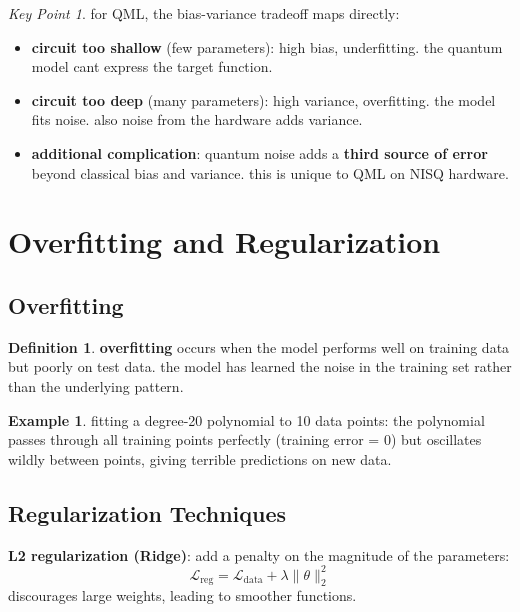 \documentclass[11pt,a4paper]{article}
\theoremstyle{definition}
\newtheorem{definition}{Definition}[section]
\newtheorem{example}{Example}[section]
\theoremstyle{remark}
\newtheorem*{keypoint}{Key Point}
\begin{document}
\begin{keypoint}
for QML, the bias-variance tradeoff maps directly:
\begin{itemize}
    \item \textbf{circuit too shallow} (few parameters): high bias, underfitting. the quantum model cant express the target function.
    \item \textbf{circuit too deep} (many parameters): high variance, overfitting. the model fits noise. also noise from the hardware adds variance.
    \item \textbf{additional complication}: quantum noise adds a \textbf{third source of error} beyond classical bias and variance. this is unique to QML on NISQ hardware.
\end{itemize}
\end{keypoint}

\section{Overfitting and Regularization}

\subsection{Overfitting}

\begin{definition}
\textbf{overfitting} occurs when the model performs well on training data but poorly on test data. the model has learned the noise in the training set rather than the underlying pattern.
\end{definition}

\begin{example}
fitting a degree-20 polynomial to 10 data points: the polynomial passes through all training points perfectly (training error = 0) but oscillates wildly between points, giving terrible predictions on new data.
\end{example}

\subsection{Regularization Techniques}

\textbf{L2 regularization (Ridge)}: add a penalty on the magnitude of the parameters:
\[
\mathcal{L}_{\text{reg}} = \mathcal{L}_{\text{data}} + \lambda \|\theta\|_2^2
\]
discourages large weights, leading to smoother functions.
\end{document}
